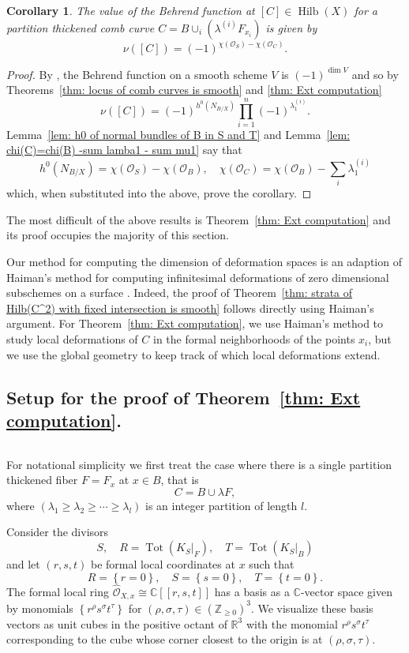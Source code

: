 \documentclass[12pt]{amsart}
\newtheorem{corollary}[theorem]{Corollary}
\theoremstyle{definition}
\newcommand{\CC} {\mathbb{C}}          %
\newcommand{\RR} {\mathbb{R}}		%
\newcommand{\ZZ} {\mathbb{Z}}		%
\renewcommand{\O}{\mathcal{O}}
\newcommand{\Hilb}{\operatorname{Hilb}}
\newcommand{\Tot}{\operatorname{Tot}}
\newcommand{\SubSecSpace}{$\,$\vspace{0.2cm}\par } %
\begin{document}
\begin{corollary}\label{cor: value of Behrend function at comb curves}
The value of the Behrend function at $[C]\in \Hilb (X)$ for a
partition thickened comb curve $C =
B\cup_{i}\left(\lambda^{(i)}F_{x_{i}} \right)$ is given by
\[
\nu ([C]) = (-1)^{\chi (\O_{S})-\chi (\O_{C})}.
\]
\end{corollary}
\begin{proof}
By \cite{Behrend-micro}, the Behrend function on a smooth scheme $V$
is $(-1)^{\dim V}$ and so by Theorems~\ref{thm: locus of comb curves
is smooth} and \ref{thm: Ext computation}
\[
\nu ([C]) = (-1)^{h^{0}(N_{B/X}) }\prod_{i=1}^{n} (-1)^{\lambda_{1}^{(i)}}. 
\]
Lemma~\ref{lem: h0 of normal bundles of B in S and T} and
Lemma~\ref{lem: chi(C)=chi(B) -sum lamba1 - sum mu1} say that
\[
h^{0}(N_{B/X}) = \chi (\O_{S}) - \chi (\O_{B}), \quad \chi (\O_{C}) =
\chi(\O_{B}) - \sum_{i} \lambda^{(i)}_{1}
\]
which, when substituted into the above, prove the corollary. 
\end{proof}
The most difficult of the above results is Theorem~\ref{thm: Ext
computation} and its proof occupies the majority of this section.

Our method for computing the dimension of deformation spaces is an
adaption of Haiman's method for computing infinitesimal deformations
of zero dimensional subschemes on a surface \cite{Haiman1998}. Indeed,
the proof of Theorem~\ref{thm: strata of Hilb(C^2) with fixed
intersection is smooth} follows directly using Haiman's argument. For
Theorem~\ref{thm: Ext computation}, we use Haiman's method to study
local deformations of $C$ in the formal neighborhoods of the points
$x_{i}$, but we use the global geometry to keep track of which local
deformations extend.

\subsection{Setup for the proof of Theorem~\ref{thm: Ext
computation}.}\SubSecSpace 

For notational simplicity we first treat the case where there is a
single partition thickened fiber $F=F_{x}$ at $x\in B$, that is
\[
C=B\cup \lambda F,
\]
where $(\lambda_{1}\geq \lambda_{2}\geq \dotsb \geq \lambda_{l})$ is
an integer partition of length $l$.

Consider the divisors
\[
S,\quad R=\Tot (K_{S}|_{F}),\quad T=\Tot (K_{S}|_{B})
\]
and let $(r,s,t)$ be formal local coordinates at $x$ such that 
\[
R=\left\{r=0 \right\},\quad S=\left\{s=0 \right\},\quad T=\left\{t=0 \right\}.
\]
The formal local ring $\widehat{\O}_{X,x}\cong \CC [[r,s,t]]$ has a basis
as a $\CC$-vector space given by monomials
$\left\{r^{\rho}s^{\sigma}t^{\tau} \right\}$ for $(\rho, \sigma,
\tau)\in \left(\ZZ_{\geq 0} \right)^{3}$. We visualize these basis
vectors as unit cubes in the positive octant of $\RR^{3}$ with the
monomial $r^{\rho}s^{\sigma}t^{\tau}$ corresponding to the cube whose
corner closest to the origin is at $(\rho ,\sigma ,\tau)$.
\end{document}
